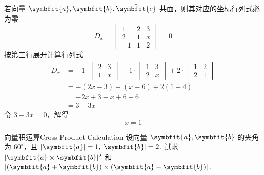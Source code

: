 \begin{solution}
    若向量 $\symbfit{a}, \symbfit{b}, \tilde{\symbfit{c}}$ 共面，则其对应的坐标行列式必为零
    \begin{equation}
        D_x = \begin{vmatrix} 1 & 2 & 3 \\ 2 & 1 & x \\ -1 & 1 & 2 \end{vmatrix} = 0
    \end{equation}
    按第三行展开计算行列式
    \begin{equation}
        \begin{aligned}
            D_x & = -1 \cdot \begin{vmatrix} 2 & 3 \\ 1 & x \end{vmatrix} - 1 \cdot \begin{vmatrix} 1 & 3 \\ 2 & x \end{vmatrix} + 2 \cdot \begin{vmatrix} 1 & 2 \\ 2 & 1 \end{vmatrix} \\
                & = -(2x - 3) - (x - 6) + 2(1 - 4)                                                                                                                                      \\
                & = -2x + 3 - x + 6 - 6                                                                                                                                                 \\
                & = 3 - 3x
        \end{aligned}
    \end{equation}
    令 $3 - 3x = 0$，解得
    \begin{equation}
        \boxed{x = 1}
    \end{equation}
\end{solution}


\begin{problem}{向量积运算}{Cross-Product-Calculation}
    设向量 $\symbfit{a}, \symbfit{b}$ 的夹角为 $60^\circ$，且 $|\symbfit{a}| = 1, |\symbfit{b}| = 2$. 试求 $|\symbfit{a} \times \symbfit{b}|^2$ 和 $|(\symbfit{a} + \symbfit{b}) \times (\symbfit{a} - \symbfit{b})|$.
\end{problem}

